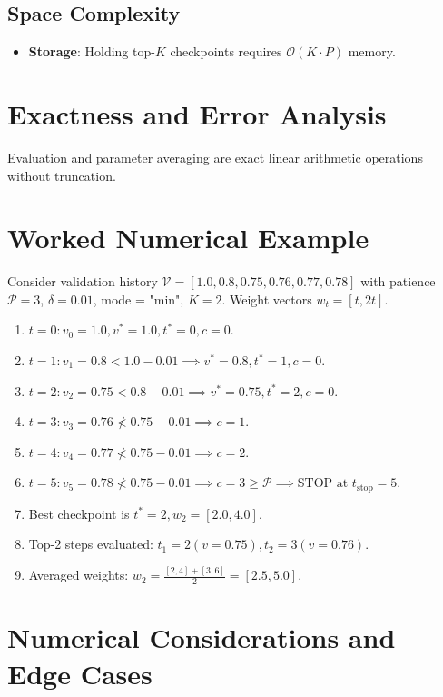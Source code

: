 \documentclass[11pt,a4paper]{article}
\theoremstyle{definition}
\begin{document}
\subsection{Space Complexity}
\begin{itemize}
    \item \textbf{Storage}: Holding top-$K$ checkpoints requires $\mathcal{O}(K \cdot P)$ memory.
\end{itemize}

\section{Exactness and Error Analysis}

Evaluation and parameter averaging are exact linear arithmetic operations without truncation.

\section{Worked Numerical Example}

Consider validation history $\mathcal{V} = [1.0, 0.8, 0.75, 0.76, 0.77, 0.78]$ with patience $\mathcal{P} = 3$, $\delta = 0.01$, mode = "min", $K = 2$. Weight vectors $w_t = [t, 2t]$.

\begin{enumerate}
    \item $t = 0: v_0 = 1.0, v^* = 1.0, t^* = 0, c = 0$.
    \item $t = 1: v_1 = 0.8 < 1.0 - 0.01 \implies v^* = 0.8, t^* = 1, c = 0$.
    \item $t = 2: v_2 = 0.75 < 0.8 - 0.01 \implies v^* = 0.75, t^* = 2, c = 0$.
    \item $t = 3: v_3 = 0.76 \not< 0.75 - 0.01 \implies c = 1$.
    \item $t = 4: v_4 = 0.77 \not< 0.75 - 0.01 \implies c = 2$.
    \item $t = 5: v_5 = 0.78 \not< 0.75 - 0.01 \implies c = 3 \ge \mathcal{P} \implies \text{STOP at } t_{\text{stop}} = 5$.
    \item Best checkpoint is $t^* = 2, w_2 = [2.0, 4.0]$.
    \item Top-2 steps evaluated: $t_1 = 2 (v=0.75), t_2 = 3 (v=0.76)$.
    \item Averaged weights: $\bar{w}_2 = \frac{[2, 4] + [3, 6]}{2} = [2.5, 5.0]$.
\end{enumerate}

\section{Numerical Considerations and Edge Cases}
\end{document}
